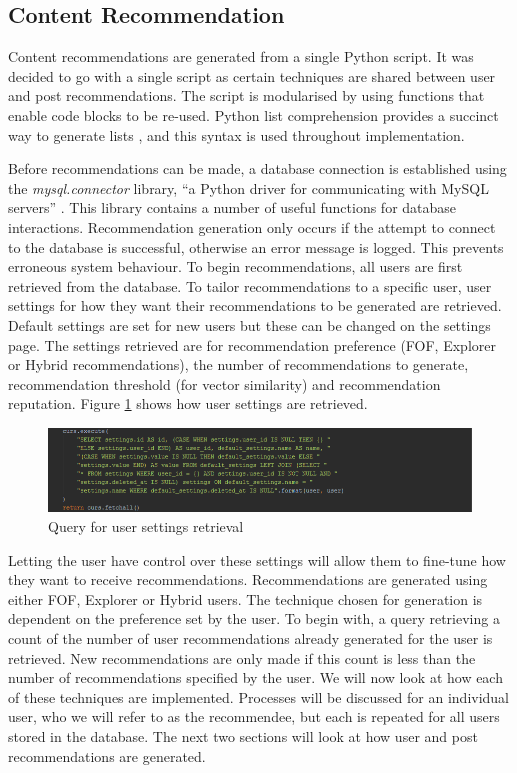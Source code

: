 \subsection{Content Recommendation}
Content recommendations are generated from a single Python script. It was decided to go with a single script as certain techniques are shared between user and post recommendations. The script is modularised by using functions that enable code blocks to be re-used. Python list comprehension provides a succinct way to generate lists \cite{Python:ListComprehension}, and this syntax is used throughout implementation.

Before recommendations can be made, a database connection is established using the \emph{mysql.connector} library, ``a Python driver for communicating with MySQL servers'' \cite{MySQL:MySQLConnector}. This library contains a number of useful functions for database interactions. Recommendation generation only occurs if the attempt to connect to the database is successful, otherwise an error message is logged. This prevents erroneous system behaviour. To begin recommendations, all users are first retrieved from the database. To tailor recommendations to a specific user, user settings for how they want their recommendations to be generated are retrieved. Default settings are set for new users but these can be changed on the settings page. The settings retrieved are for recommendation preference (FOF, Explorer or Hybrid recommendations), the number of recommendations to generate, recommendation threshold (for vector similarity) and recommendation reputation. Figure \ref{fig:RecommendationSettings} shows how user settings are retrieved.


\begin{figure}[H]
\centering
\includegraphics[width=\textwidth]{Images/Implementation/RecommendationSettings}
\caption{Query for user settings retrieval}
\label{fig:RecommendationSettings}
\end{figure}

Letting the user have control over these settings will allow them to fine-tune how they want to receive recommendations. Recommendations are generated using either FOF, Explorer or Hybrid users. The technique chosen for generation is dependent on the preference set by the user. To begin with, a query retrieving a count of the number of user recommendations already generated for the user is retrieved. New recommendations are only made if this count is less than the number of recommendations specified by the user. We will now look at how each of these techniques are implemented. Processes will be discussed for an individual user, who we will refer to as the recommendee, but each is repeated for all users stored in the database. The next two sections will look at how user and post recommendations are generated.

